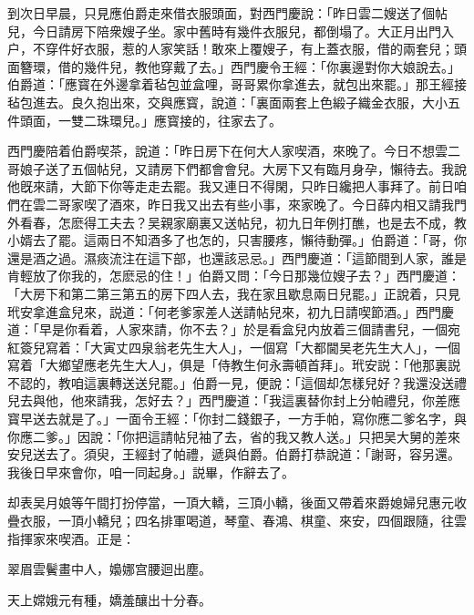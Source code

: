到次日早晨，只見應伯爵走來借衣服頭面，對西門慶說：「昨日雲二嫂送了個帖兒，今日請房下陪衆嫂子坐。家中舊時有幾件衣服兒，都倒塌了。大正月出門入户，不穿件好衣服，惹的人家笑話！敢來上覆嫂子，有上蓋衣服，借的兩套兒；頭面簪環，借的幾件兒，教他穿戴了去。」西門慶令王經：「你裏邊對你大娘說去。」伯爵道：「應寳在外邊拿着毡包並盒哩，哥哥累你拿進去，就包出來罷。」那王經接毡包進去。良久抱出來，交與應寳，說道：「裏面兩套上色緞子織金衣服，大小五件頭面，一雙二珠環兒。」應寳接的，往家去了。

西門慶陪着伯爵喫茶，說道：「昨日房下在何大人家喫酒，來晚了。今日不想雲二哥娘子送了五個帖兒，又請房下們都會會兒。大房下又有臨月身孕，懶待去。我說他旣來請，大節下你等走走去罷。我又連日不得閑，只昨日纔把人事拜了。前日咱們在雲二哥家喫了酒來，昨日我又出去有些小事，來家晚了。今日薛内相又請我門外看春，怎麽得工夫去？吴親家廟裏又送帖兒，初九日年例打醮，也是去不成，教小婿去了罷。這兩日不知酒多了也怎的，只害腰疼，懶待動彈。」伯爵道：「哥，你還是酒之過。濕痰流注在這下部，也還該忌忌。」西門慶道：「這節間到人家，誰是肯輕放了你我的，怎麽忌的住！」伯爵又問：「今日那幾位嫂子去？」西門慶道：「大房下和第二第三第五的房下四人去，我在家且歇息兩日兒罷。」正說着，只見玳安拿進盒兒來，説道：「何老爹家差人送請帖兒來，初九日請喫節酒。」西門慶道：「早是你看着，人家來請，你不去？」於是看盒兒内放着三個請書兒，一個宛紅簽兒寫着：「大寅丈四泉翁老先生大人」，一個寫「大都閫吴老先生大人」，一個寫着「大鄉望應老先生大人」，俱是「侍教生何永壽頓首拜」。玳安説：「他那裏説不認的，教咱這裏轉送送兒罷。」伯爵一見，便說：「這個却怎樣兒好？我還没送禮兒去與他，他來請我，怎好去？」西門慶道：「我這裏替你封上分帕禮兒，你差應寳早送去就是了。」一面令王經：「你封二錢銀子，一方手帕，寫你應二爹名字，與你應二爹。」因說：「你把這請帖兒袖了去，省的我又教人送。」只把吴大舅的差來安兒送去了。須臾，王經封了帕禮，遞與伯爵。伯爵打恭說道：「謝哥，容另還。我後日早來會你，咱一同起身。」説畢，作辭去了。

却表吴月娘等午間打扮停當，一頂大轎，三頂小轎，後面又帶着來爵媳婦兒惠元收疊衣服，一頂小轎兒；四名排軍喝道，琴童、春鴻、棋童、來安，四個跟隨，往雲指揮家來喫酒。正是：　

翠眉雲鬢畫中人，嬝娜宫腰迴出塵。

天上嫦娥元有種，嬌羞釀出十分春。

